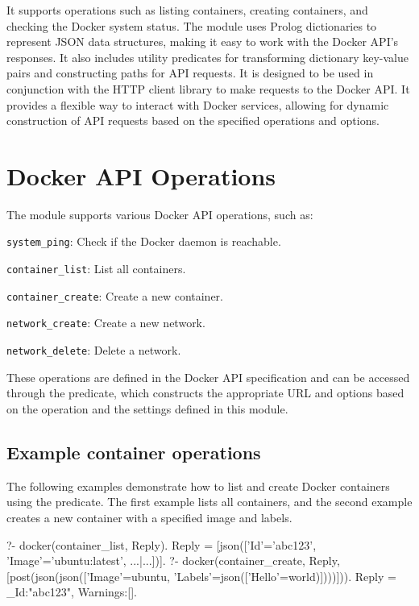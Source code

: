It supports operations such as listing containers, creating containers, and
checking the Docker system status. The module uses Prolog dictionaries to
represent JSON data structures, making it easy to work with the Docker API's
responses. It also includes utility predicates for transforming dictionary
key-value pairs and constructing paths for API requests. It is designed to be
used in conjunction with the HTTP client library to make requests to the Docker
API. It provides a flexible way to interact with Docker services, allowing for
dynamic construction of API requests based on the specified operations and
options.

\section{Docker API Operations}

The module supports various Docker API operations, such as:

\begin{shortlist}
    \item \verb$system_ping$: Check if the Docker daemon is reachable.
    \item \verb$container_list$: List all containers.
    \item \verb$container_create$: Create a new container.
    \item \verb$network_create$: Create a new network.
    \item \verb$network_delete$: Delete a network.
\end{shortlist}

These operations are defined in the Docker API specification and can be accessed
through the  predicate, which constructs the appropriate URL and
options based on the operation and the settings defined in this module.

\subsection{Example container operations}

The following examples demonstrate how to list and create Docker containers
using the  predicate. The first example lists all containers, and the
second example creates a new container with a specified image and labels.

\begin{code}
?- docker(container_list, Reply).
Reply = [json(['Id'='abc123', 'Image'='ubuntu:latest', ...|...])].
?- docker(container_create, Reply, [post(json(json(['Image'=ubuntu,
   'Labels'=json(['Hello'=world)])))])).
Reply = _{Id:"abc123", Warnings:[]}.
\end{code}

